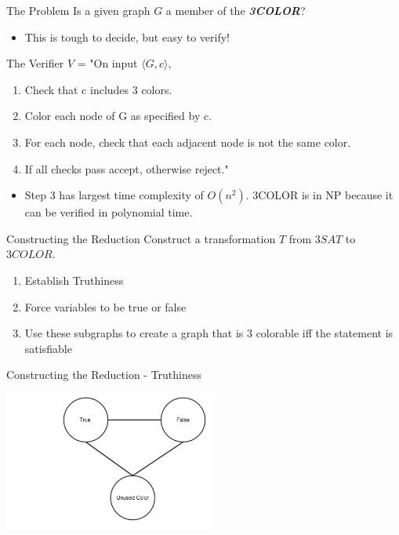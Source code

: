 \documentclass[bigger]{beamer}
\begin{document}
\begin{frame}[label=sec-4]{The Problem}
Is a given graph \(G\) a member of the \textbf{\textit{3COLOR}}?

\begin{itemize}
\item<2-> This is tough to decide, but easy to verify!
\end{itemize}
\end{frame}

\begin{frame}[label=sec-5]{The Verifier}
\(V\) = "On input \(\langle G, c \rangle\),
\begin{enumerate}
\item<1-> Check that c includes 3 colors.
\item<2-> Color each node of G as specified by c.
\item<3-> For each node, check that each adjacent node is not the same color.
\item<4-> If all checks pass accept, otherwise reject."
\end{enumerate}

\begin{itemize}
\item<5->Step 3 has largest time complexity of \(O(n^2)\). 3COLOR is in NP because it can be verified in polynomial time.
\end{itemize}
\end{frame}


\begin{frame}[label=sec-6]{Constructing the Reduction}
Construct a transformation \(T\) from \(3SAT\) to \(3COLOR\).
\begin{enumerate}
\item<2-> Establish Truthiness
\item<3-> Force variables to be true or false
\item<4-> Use these subgraphs to create a graph that is 3 colorable iff the statement is satisfiable
\end{enumerate}
\end{frame}

\begin{frame}[label=sec-7]{Constructing the Reduction - Truthiness}
\begin{center}
\includegraphics[width=7cm]{Truthiness.png}
\end{center}
\end{frame}
\end{document}
